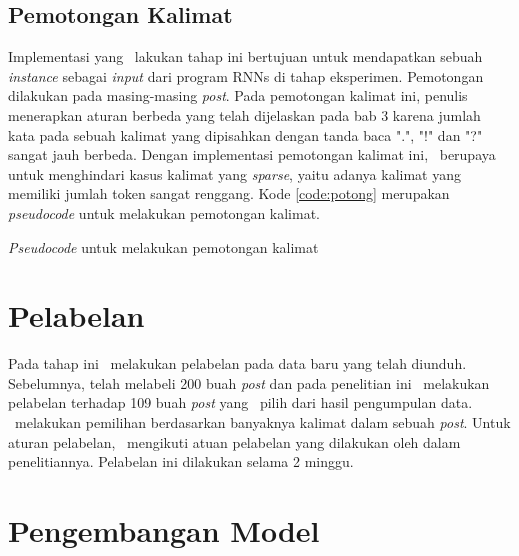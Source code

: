 \subsection{Pemotongan Kalimat}
Implementasi yang \saya~lakukan tahap ini bertujuan untuk mendapatkan sebuah \textit{instance} sebagai \textit{input} dari program RNNs di tahap eksperimen. Pemotongan dilakukan pada masing-masing \textit{post}. Pada pemotongan kalimat ini, penulis menerapkan aturan berbeda yang telah dijelaskan pada bab 3 karena jumlah kata pada sebuah kalimat yang dipisahkan dengan tanda baca ".", "!" dan "?" sangat jauh berbeda. Dengan implementasi pemotongan kalimat ini, \saya~berupaya untuk menghindari kasus kalimat yang \textit{sparse}, yaitu adanya kalimat yang memiliki jumlah token sangat renggang. Kode \ref{code:potong} merupakan \textit{pseudocode} untuk melakukan pemotongan kalimat.

\begin{kode}
	
	
	\caption{\textit{Pseudocode} untuk melakukan pemotongan kalimat}
	\label{code:potong}
\end{kode}

\section{Pelabelan}
Pada tahap ini \saya~melakukan pelabelan pada data baru yang telah diunduh. Sebelumnya, \cite{skripsiKakRadit} telah melabeli 200 buah \textit{post} dan pada penelitian ini \saya~melakukan pelabelan terhadap 109 buah \textit{post} yang \saya~pilih dari hasil pengumpulan data. \Saya~melakukan pemilihan berdasarkan banyaknya kalimat dalam sebuah \textit{post}. Untuk aturan pelabelan, \saya~mengikuti atuan pelabelan yang dilakukan oleh \cite{skripsiKakRadit} dalam penelitiannya. Pelabelan ini dilakukan selama 2 minggu.

\section{Pengembangan Model}

